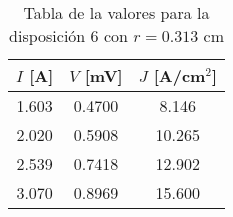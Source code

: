 \begin{table}[h!]
    \centering
\begin{tabular}{ccc}
\toprule
$I$ [A] & $V$ [mV] & $J$ [A/cm$^2$] \\
\midrule
1.603 & 0.4700 & 8.146 \\
2.020 & 0.5908 & 10.265 \\
2.539 & 0.7418 & 12.902 \\
3.070 & 0.8969 & 15.600 \\
\bottomrule
\end{tabular}
    \caption{Tabla de la valores para la disposición 6 con $r=0.313$ cm}
    \label{Tab:VIJ_6}
\end{table}
